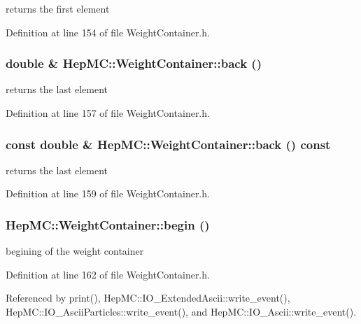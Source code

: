 returns the first element 



Definition at line 154 of file Weight\-Container.h.
\subsubsection{\setlength{\rightskip}{0pt plus 5cm}double \& Hep\-MC::Weight\-Container::back ()\hspace{0.3cm}{\tt  [inline]}}\label{classHepMC_1_1WeightContainer_49890badd4021e81a0786a5d12fec76c}


returns the last element 



Definition at line 157 of file Weight\-Container.h.
\subsubsection{\setlength{\rightskip}{0pt plus 5cm}const double \& Hep\-MC::Weight\-Container::back () const\hspace{0.3cm}{\tt  [inline]}}\label{classHepMC_1_1WeightContainer_b06ee24b068cb78ddaeecc35c5396da7}


returns the last element 



Definition at line 159 of file Weight\-Container.h.
\subsubsection{ Hep\-MC::Weight\-Container::begin ()\hspace{0.3cm}{\tt  [inline]}}\label{classHepMC_1_1WeightContainer_9fef3c434109f14a532b15c316d33043}


begining of the weight container 



Definition at line 162 of file Weight\-Container.h.

Referenced by print(), Hep\-MC::IO\_\-Extended\-Ascii::write\_\-event(), Hep\-MC::IO\_\-Ascii\-Particles::write\_\-event(), and Hep\-MC::IO\_\-Ascii::write\_\-event().
